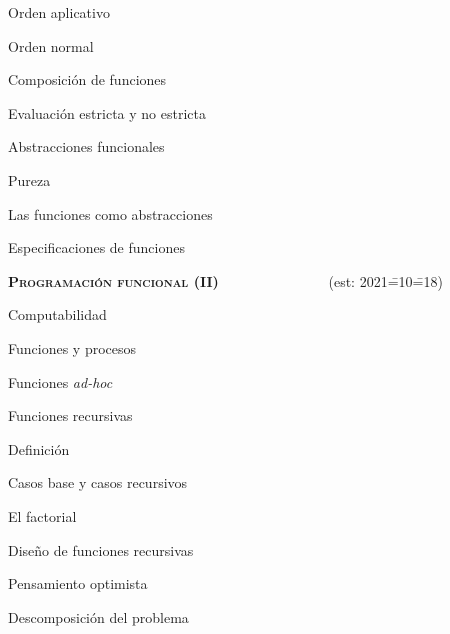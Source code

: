 \begin{longenum}
\begin{longenum}
\begin{longenum}
\begin{longenum}
                \begin{longenum}
                    \item Orden aplicativo
                    \item Orden normal
                \end{longenum}
                \item Composición de funciones
                \item Evaluación estricta y no estricta
            \end{longenum}
        \end{longenum}
        \item Abstracciones funcionales
        \begin{longenum}
            \item Pureza
            \item Las funciones como abstracciones
            \begin{longenum}
                \item Especificaciones de funciones
            \end{longenum}
        \end{longenum}
    \end{longenum}
    \item \textbf{\textsc{Programación funcional (II)}} \ \ \ \ \ \ \ \ \ \ \ \ \ \ \ (est: 2021\==10\==18)
    \begin{longenum}
        \item Computabilidad
        \begin{longenum}
            \item Funciones y procesos
            \item Funciones \textit{ad-hoc}
            \item Funciones recursivas
            \begin{longenum}
                \item Definición
                \item Casos base y casos recursivos
                \item El factorial
                \item Diseño de funciones recursivas
                \begin{longenum}
                    \item Pensamiento optimista
                    \item Descomposición del problema

\end{longenum}
\end{longenum}
\end{longenum}
\end{longenum}
\end{longenum}
